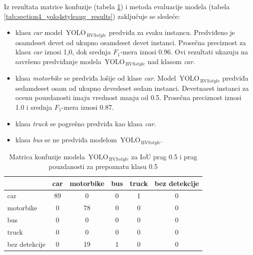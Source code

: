 \documentclass[12pt,oneside]{memoir}
\newcommand{\yolo}{\ensuremath{\,\textrm{YOLO}}}
\newcommand{\bvs}{\ensuremath{\,\textrm{BVS}}}
\begin{document}
Iz rezultata matrice konfuzije (tabela \ref{tab:section4_yolo4styleaug_confusionmatrix}) i metoda evaluacije modela (tabela \ref{tab:section4_yolo4styleaug_results}) zaključuje se sledeće:
\begin{itemize}
    \item klasu \textit{car} model $\yolo_{\bvs{style}}$ predviđa za svaku instancu. Predviđeno je osamdeset devet od ukupno osamdeset devet instanci. Prosečna preciznost za klasu \textit{car} iznosi 1,0, dok srednja $F_1$-mera iznosi 0.96. Ovi rezultati ukazuju na savršeno predviđanje modela $\yolo_{\bvs{style}}$ nad klasom \textit{car}.
    \item klasa \textit{motorbike} se predviđa lošije od klase \textit{car}. Model $\yolo_{\bvs{style}}$ predviđa sedamdeset osam od ukupno devedeset sedam instanci. Devetnaest instanci za ocenu pouzdanosti imaju vrednost manju od 0.5. Prosečna preciznost iznosi 1.0 i srednja $F_1$-mera iznosi 0.87.
    \item klasa \textit{truck} se pogrešno predviđa kao klasa \textit{car}. 
    \item klasa \textit{bus} se ne predviđa modelom $\yolo_{\bvs{style}}$.
\end{itemize}



\begin{table}
    \begin{center}
    \caption{Matrica konfuzije modela $\yolo_{\bvs{style}}$ za IoU prag 0.5 i prag pouzdanosti za prepoznatu klasu 0.5 }
    \begin{tabular}{ l|c|c|c|c|c|}
                  & car  & motorbike & bus & truck & bez detekcije \\ \hline
    car           & 89   & 0         & 0   & 1     & 0             \\ 
    motorbike     & 0    & 78        & 0   & 0     & 0             \\ 
    bus           & 0    & 0         & 0   & 0     & 0             \\ 
    truck         & 0    & 0         & 0   & 0     & 0             \\ 
    bez detekcije & 0    & 19        & 1   & 0     & 0             \\ \hline
    \hline
    \end{tabular}
    \label{tab:section4_yolo4styleaug_confusionmatrix}
    \end{center}
\end{table}
\end{document}
